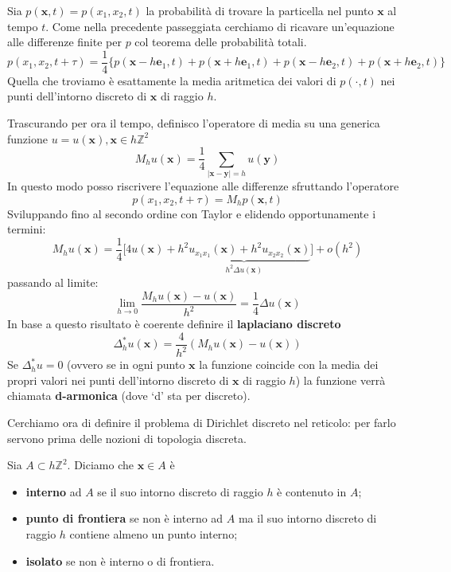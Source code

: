 \documentclass[10pt,a4paper,twoside,openright]{book}
\newcommand{\x}{\mathbf{x}}
\newcommand{\y}{\mathbf{y}}
\begin{document}
Sia $\displaystyle p(\x,t) =p(x_{1},x_{2},t)$ la probabilità di trovare la particella nel punto $\x$ al tempo $t$. Come nella precedente passeggiata cerchiamo di ricavare un'equazione alle differenze finite per $p$ col teorema delle probabilità totali.
\begin{equation*}
	p( x_{1},x_{2},t+\tau) =\frac{1}{4}\{p( \x-h\mathbf{e}_{1},t) +p( \x+h\mathbf{e}_{1},t) +p( \x-h\mathbf{e}_{2},t) +p( \x+h\mathbf{e}_{2},t)\}
\end{equation*}
Quella che troviamo è esattamente la media aritmetica dei valori di $p(\cdotp,t)$ nei punti dell'intorno discreto di $\x$ di raggio $h$. 

Trascurando per ora il tempo, definisco l'operatore di media su una generica funzione $u=u(\x),\x\in h\mathbb{Z}^{2}$
\begin{equation*}
	M_{h} u(\x) =\frac{1}{4}\sum _{| \x-\y| =h} u(\y)
\end{equation*}
In questo modo posso riscrivere l'equazione alle differenze sfruttando l'operatore
\begin{equation*}
	p( x_{1},x_{2},t+\tau) =M_{h} p(\x,t)
\end{equation*}
Sviluppando fino al secondo ordine con Taylor e elidendo opportunamente i termini:
\begin{equation*}
M_{h} u(\x) =\frac{1}{4}\bigg[4u(\x) +\underbrace{h^{2} u_{x_{1} x_{1}}(\x) +h^{2} u_{x_{2} x_{2}}(\x)}_{h^{2} \Delta u(\x)}\bigg] +o\left( h^{2}\right)
\end{equation*}
passando al limite:
\begin{equation*}
\lim _{h\rightarrow 0}\frac{M_{h} u(\x) -u(\x)}{h^{2}} =\frac{1}{4} \Delta u(\x)
\end{equation*}
In base a questo risultato è coerente definire il \textbf{laplaciano discreto}
\begin{equation}
	\Delta ^{*}_{h} u(\x) =\frac{4}{h^{2}}(M_{h} u(\x) -u(\x))
\end{equation}
Se $\displaystyle \Delta ^{*}_{h} u=0$ (ovvero se in ogni punto $\x$ la funzione coincide con la media dei propri valori nei punti dell'intorno discreto di $\x$ di raggio $\displaystyle h$) la funzione verrà chiamata \textbf{d-armonica} (dove `d' sta per discreto).

Cerchiamo ora di definire il problema di Dirichlet discreto nel reticolo: per farlo servono prima delle nozioni di topologia discreta.

Sia $\displaystyle A \subset h\mathbb{Z}^{2}$. Diciamo che $\x\in A$ è
\begin{itemize}
	\item \textbf{interno} ad $\displaystyle A$ se il suo intorno discreto di raggio $\displaystyle h$ è contenuto in $\displaystyle A$;
	\item \textbf{punto di frontiera} se non è interno ad $\displaystyle A$ ma il suo intorno discreto di raggio $\displaystyle h$ contiene almeno un punto interno;
	\item \textbf{isolato} se non è interno o di frontiera.
\end{itemize}
\end{document}
